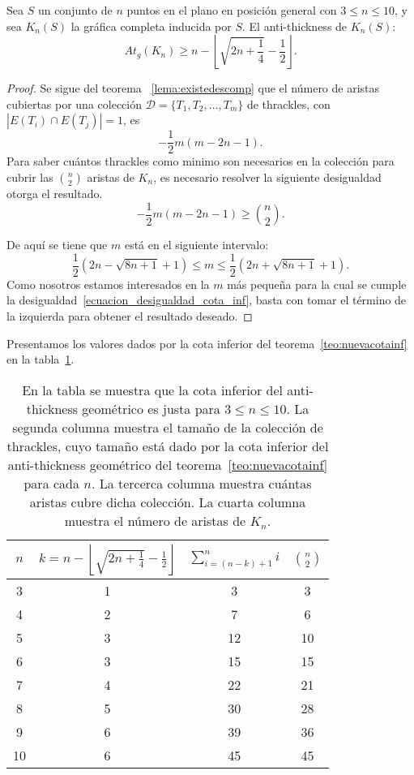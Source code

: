 \begin{theorem}\label{teo:nuevacotainf}
  Sea $S$ un conjunto de $n$ puntos en el plano en posición general con $3\leq n \leq 10$, y sea $K_n(S)$ la gráfica completa inducida por $S$. El anti-thickness de $K_n(S)$:
  \begin{equation}
    At_g(K_n) \geq n - \left\lfloor\sqrt{2n+\frac{1}{4}} - \frac{1}{2}\right\rfloor.
    \label{ecuacion_cota_inf}
  \end{equation}
\end{theorem}
\begin{proof}
  Se sigue del teorema ~\ref{lema:existedescomp} que el número de aristas
  cubiertas por una colección $\mathcal{D}=\{T_1,T_2,\dots,T_m\}$ de thrackles,
  con $|E(T_i)\cap E(T_j)| = 1$, es
  \[ -\frac{1}{2}m(m-2n-1). \]
  Para saber cuántos thrackles como minimo son necesarios en la colección para
  cubrir las $\binom{n}{2}$ aristas de $K_n$, es necesario resolver la
  siguiente desigualdad otorga el resultado.
  \begin{equation}
     -\frac{1}{2}m(m-2n-1) \geq \binom{n}{2}.
     \label{ecuacion_desigualdad_cota_inf}
  \end{equation}

  De aquí se tiene que $m$ está en el siguiente intervalo:
  \[
    \frac{1}{2}\left(2n-\sqrt{8n+1} + 1\right) \leq m \leq  \frac{1}{2}\left(2n+\sqrt{8n+1} + 1\right).
  \]
  Como nosotros estamos interesados en la $m$ más pequeña para la cual se cumple la desigualdad~\ref{ecuacion_desigualdad_cota_inf}, basta con tomar el término de la izquierda para obtener el resultado deseado.
\end{proof}
  Presentamos los valores dados por la cota inferior del
  teorema~\ref{teo:nuevacotainf} en la tabla~\ref{table:atnuevacota}.
  \begin{table}[t]
    \centering
    \begin{tabular}{|c|c|c|c|}
      \hline
      $n$ & $k=n - \left\lfloor\sqrt{2n+\frac{1}{4}} - \frac{1}{2}\right\rfloor$ & $\sum^n_{i=(n-k) + 1}i$ & $\binom{n}{2}$\\[5pt] \hline\hline
      3   & 1  & 3 & 3 \\ \hline
      4   & 2  & 7 & 6 \\ \hline
      5   & 3  & 12 & 10 \\ \hline
      6   & 3  & 15 & 15 \\ \hline
      7   & 4  & 22 & 21 \\ \hline
      8   & 5  & 30 & 28 \\ \hline
      9   & 6  & 39 & 36 \\ \hline
      10  & 6  & 45 & 45 \\ \hline
    \end{tabular}
    \caption{En la tabla se muestra que la cota inferior del anti-thickness
    geométrico es justa para $3 \leq n \leq 10$. La segunda columna muestra el
    tamaño de la colección de thrackles, cuyo tamaño está dado por la cota
    inferior del anti-thickness geométrico del teorema~\ref{teo:nuevacotainf}
    para cada $n$. La tercerca columna muestra cuántas aristas cubre dicha
    colección. La cuarta columna muestra el número de aristas de $K_n$.}
    \label{table:atnuevacota}
  \end{table}

